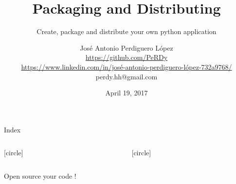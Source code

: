 \documentclass[final, 9pt, svgnames]{beamerPerdy}
\title{Packaging and Distributing}
\subtitle{Create, package and distribute your own python application}
\author[J. A. Perdiguero López]{
José Antonio Perdiguero López\\
\href{https://github.com/PeRDy}{\scriptsize{\faGithub\; https://github.com/PeRDy}}\\
\href{https://www.linkedin.com/in/josé-antonio-perdiguero-lópez-732a9768/}{\scriptsize{\faLinkedin\; https://www.linkedin.com/in/josé-antonio-perdiguero-lópez-732a9768/}}\\
\scriptsize{\faAt\; perdy.hh@gmail.com}}
\date{April 19, 2017}
\institute[Málaga Python]{Málaga Python MeetUp}
\begin{document}
\begin{frame}
    \titlepage
\end{frame}

\begin{frame}{Index}
    \begin{columns}[t]
        \begin{column}{5cm}
            [circle]
            \tableofcontents[sections={1-2}]
        \end{column}
        \begin{column}{5cm}
            [circle]
            \tableofcontents[sections={3-5}]
        \end{column}
    \end{columns}
\end{frame}







\begin{frame}[standout]
    \Huge{Open source your code !}

    \Huge{\faLinux}
\end{frame}
\end{document}
